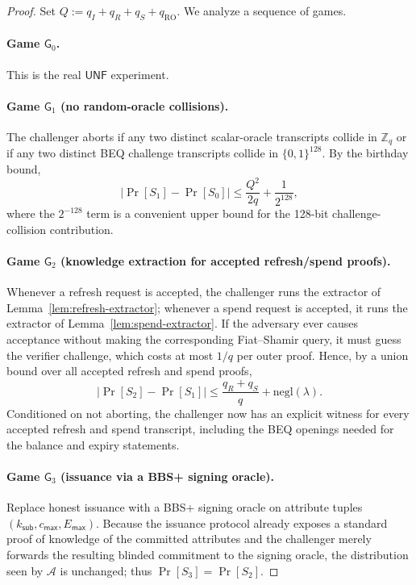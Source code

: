 \documentclass[11pt]{article}
\theoremstyle{definitionstyle}
\theoremstyle{plain}
\newcommand{\negl}{\mathrm{negl}}
\begin{document}
\begin{proof}
Set $Q := q_I + q_R + q_S + q_{\text{RO}}$. We analyze a sequence of games.

\paragraph{Game $\mathsf{G}_0$.} This is the real $\mathsf{UNF}$ experiment.

\paragraph{Game $\mathsf{G}_1$ (no random-oracle collisions).} The challenger aborts if any two distinct scalar-oracle transcripts collide in $\mathbb{Z}_q$ or if any two distinct BEQ challenge transcripts collide in $\{0,1\}^{128}$. By the birthday bound,
\[
|\Pr[S_1]-\Pr[S_0]| \le \frac{Q^2}{2q} + \frac{1}{2^{128}},
\]
where the $2^{-128}$ term is a convenient upper bound for the 128-bit challenge-collision contribution.

\paragraph{Game $\mathsf{G}_2$ (knowledge extraction for accepted refresh/spend proofs).} Whenever a refresh request is accepted, the challenger runs the extractor of Lemma~\ref{lem:refresh-extractor}; whenever a spend request is accepted, it runs the extractor of Lemma~\ref{lem:spend-extractor}. If the adversary ever causes acceptance without making the corresponding Fiat--Shamir query, it must guess the verifier challenge, which costs at most $1/q$ per outer proof. Hence, by a union bound over all accepted refresh and spend proofs,
\[
|\Pr[S_2]-\Pr[S_1]| \le \frac{q_R+q_S}{q} + \negl(\lambda).
\]
Conditioned on not aborting, the challenger now has an explicit witness for every accepted refresh and spend transcript, including the BEQ openings needed for the balance and expiry statements.

\paragraph{Game $\mathsf{G}_3$ (issuance via a BBS+ signing oracle).} Replace honest issuance with a BBS+ signing oracle on attribute tuples $(k_{\mathsf{sub}},c_{\mathsf{max}},E_{\mathsf{max}})$. Because the issuance protocol already exposes a standard proof of knowledge of the committed attributes and the challenger merely forwards the resulting blinded commitment to the signing oracle, the distribution seen by $\mathcal{A}$ is unchanged; thus $\Pr[S_3]=\Pr[S_2]$.


\end{proof}
\end{document}
